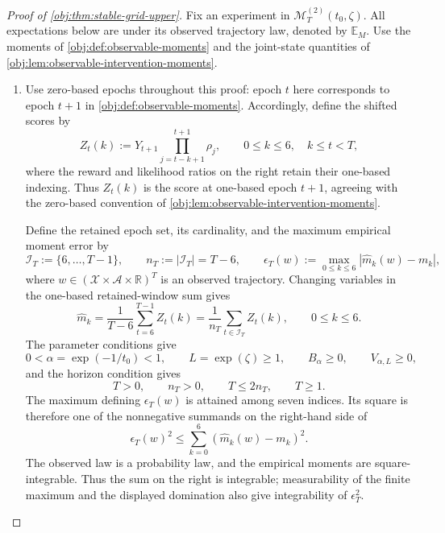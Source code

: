 \documentclass[11pt]{article}
\begin{document}
\begin{proof}[Proof of \cref{obj:thm:stable-grid-upper}]
Fix an experiment in \(\mathcal M_T^{(2)}(t_0,\zeta)\). All expectations below are under its observed trajectory law, denoted by \(\mathbb E_M\). Use the moments of \cref{obj:def:observable-moments} and the joint-state quantities of \cref{obj:lem:observable-intervention-moments}.

\begin{enumerate}
\item Use zero-based epochs throughout this proof: epoch \(t\) here corresponds to epoch \(t+1\) in \cref{obj:def:observable-moments}. Accordingly, define the shifted scores by
\[
Z_t(k):=Y_{t+1}\prod_{j=t-k+1}^{t+1}\rho_j,
\qquad 0\le k\le6,\quad k\le t<T,
\]
where the reward and likelihood ratios on the right retain their one-based indexing. Thus \(Z_t(k)\) is the score at one-based epoch \(t+1\), agreeing with the zero-based convention of \cref{obj:lem:observable-intervention-moments}.

Define the retained epoch set, its cardinality, and the maximum empirical moment error by
\[
\mathcal I_T:=\{6,\ldots,T-1\},
\qquad
n_T:=|\mathcal I_T|=T-6,
\qquad
\epsilon_T(w):=
\max_{0\le k\le6}|\widehat m_k(w)-m_k|,
\]
where \(w\in(\mathcal X\times\mathcal A\times\mathbb R)^T\) is an observed trajectory. Changing variables in the one-based retained-window sum gives
\[
\widehat m_k
=
\frac1{T-6}\sum_{t=6}^{T-1}Z_t(k)
=
\frac1{n_T}\sum_{t\in\mathcal I_T}Z_t(k),
\qquad 0\le k\le6.
\]
The parameter conditions give
\[
0<\alpha=\exp(-1/t_0)<1,
\qquad
L=\exp(\zeta)\ge1,
\qquad
B_\alpha\ge0,
\qquad
V_{\alpha,L}\ge0,
\]
and the horizon condition gives
\[
T>0,\qquad n_T>0,\qquad T\le2n_T,\qquad T\ge1.
\]
The maximum defining \(\epsilon_T(w)\) is attained among seven indices. Its square is therefore one of the nonnegative summands on the right-hand side of
\[
\epsilon_T(w)^2
\le
\sum_{k=0}^{6}(\widehat m_k(w)-m_k)^2.
\]
The observed law is a probability law, and the empirical moments are square-integrable. Thus the sum on the right is integrable; measurability of the finite maximum and the displayed domination also give integrability of \(\epsilon_T^2\).


\end{enumerate}
\end{proof}
\end{document}
